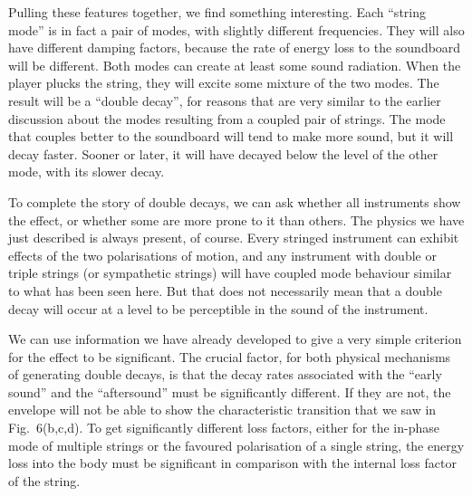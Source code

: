 
  Pulling these features together, we find something interesting. Each “string 
  mode” is in fact a pair of modes, with slightly different frequencies. They 
  will also have different damping factors, because the rate of energy loss to 
  the soundboard will be different. Both modes can create at least some sound 
  radiation. When the player plucks the string, they will excite some mixture 
  of the two modes. The result will be a “double decay”, for reasons that are 
  very similar to the earlier discussion about the modes resulting from a 
  coupled pair of strings. The mode that couples better to the soundboard will 
  tend to make more sound, but it will decay faster. Sooner or later, it will 
  have decayed below the level of the other mode, with its slower decay. 

  To complete the story of double decays, we can ask whether all instruments 
  show the effect, or whether some are more prone to it than others. The 
  physics we have just described is always present, of course. Every stringed 
  instrument can exhibit effects of the two polarisations of motion, and any 
  instrument with double or triple strings (or sympathetic strings) will have 
  coupled mode behaviour similar to what has been seen here. But that does not 
  necessarily mean that a double decay will occur at a level to be perceptible 
  in the sound of the instrument. 

  We can use information we have already developed to give a very simple 
  criterion for the effect to be significant. The crucial factor, for both 
  physical mechanisms of generating double decays, is that the decay rates 
  associated with the ``early sound'' and the ``aftersound'' must be 
  significantly different. If they are not, the envelope will not be able to 
  show the characteristic transition that we saw in Fig.\ 6(b,c,d). To get 
  significantly different loss factors, either for the in-phase mode of 
  multiple strings or the favoured polarisation of a single string, the energy 
  loss into the body must be significant in comparison with the internal loss 
  factor of the string. 

